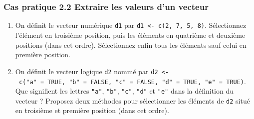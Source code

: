 \documentclass[12pt,twosided, notitlepage]{book}
\newenvironment{Shaded}{}{}
\newcommand{\CommentTok}[1]{\textcolor[rgb]{0.00,0.50,0.00}{#1}}
\newcommand{\DecValTok}[1]{#1}
\newcommand{\KeywordTok}[1]{\textcolor[rgb]{0.00,0.00,1.00}{#1}}
\newcommand{\NormalTok}[1]{#1}
\newcommand{\OperatorTok}[1]{#1}
\newcommand{\StringTok}[1]{\textcolor[rgb]{0.00,0.50,0.50}{#1}}
\newif \ifsol
\renewenvironment{Shaded}{\begin{snugshade}}{\end{snugshade}}
\begin{document}
~

~

\hypertarget{cas-pratique-2.2-extraire-les-valeurs-dun-vecteur}{%
\subsubsection{\texorpdfstring{\textbf{Cas pratique 2.2} Extraire les
valeurs d'un
vecteur}{Cas pratique 2.2 Extraire les valeurs d'un vecteur}}\label{cas-pratique-2.2-extraire-les-valeurs-dun-vecteur}}


\begin{enumerate}
\def\labelenumi{\alph{enumi}.}
\item
  On définit le vecteur numérique \texttt{d1} par
  \texttt{d1\ \textless{}-\ c(2,\ 7,\ 5,\ 8)}. Sélectionnez l'élément en
  troisième position, puis les éléments en quatrième et deuxième
  positions (dans cet ordre). Sélectionnez enfin tous les éléments sauf
  celui en première position.\index{\texttt{[}}

  \ifsol 

  \begin{center} \rule{0.5\linewidth}{\linethickness}\end{center}

\begin{Shaded}
\begin{Highlighting}[]
\NormalTok{d1 <-}\StringTok{ }\KeywordTok{c}\NormalTok{(}\DecValTok{2}\NormalTok{, }\DecValTok{7}\NormalTok{, }\DecValTok{5}\NormalTok{, }\DecValTok{8}\NormalTok{)}
\NormalTok{d1}
\NormalTok{  ## [1] 2 7 5 8}

\CommentTok{# Sélection de l'élément en troisième position}
\NormalTok{d1[}\DecValTok{3}\NormalTok{]}
\NormalTok{  ## [1] 5}

\CommentTok{# Sélection des éléments en quatrième et en deuxième}
\CommentTok{# position (dans cet ordre)}
\NormalTok{d1[}\KeywordTok{c}\NormalTok{(}\DecValTok{4}\NormalTok{, }\DecValTok{2}\NormalTok{)]}
\NormalTok{  ## [1] 8 7}

\CommentTok{# Sélection de tous les éléments sauf celui en}
\CommentTok{# première position}
\NormalTok{d1[}\OperatorTok{-}\DecValTok{1}\NormalTok{]}
\NormalTok{  ## [1] 7 5 8}
\end{Highlighting}
\end{Shaded}

  \begin{center} \rule{0.5\linewidth}{\linethickness}\end{center} 
    \bigskip 
    \fi
\item
  On définit le vecteur logique \texttt{d2} nommé par
  \texttt{d2\ \textless{}-\ c("a"\ =\ TRUE,\ "b"\ =\ FALSE,\ "c"\ =\ FALSE,\ "d"\ =\ TRUE,\ "e"\ =\ TRUE)}.
  Que signifient les lettres \texttt{"a"}, \texttt{"b"}, \texttt{"c"},
  \texttt{"d"} et \texttt{"e"} dans la définition du vecteur ? Proposez
  deux méthodes pour sélectionner les éléments de \texttt{d2} situé en
  troisième et première position (dans cet ordre).\index{\texttt{[}}


\end{enumerate}
\end{document}
